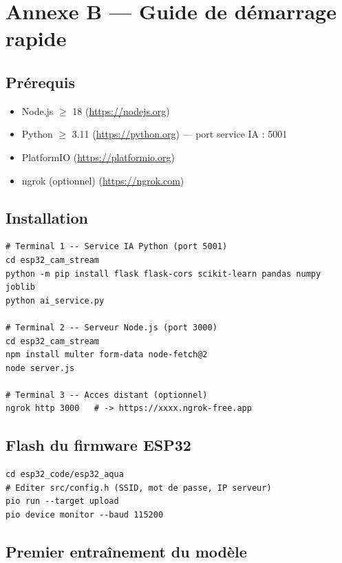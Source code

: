 \documentclass[12pt,a4paper]{report}
\begin{document}
\chapter{Annexe B --- Guide de démarrage rapide}

\section{Prérequis}
\begin{itemize}
  \item Node.js $\geq$ 18 (\url{https://nodejs.org})
  \item Python $\geq$ 3.11 (\url{https://python.org}) --- port service IA : 5001
  \item PlatformIO (\url{https://platformio.org})
  \item ngrok (optionnel) (\url{https://ngrok.com})
\end{itemize}

\section{Installation}

\begin{lstlisting}[caption={Installation et démarrage}]
# Terminal 1 -- Service IA Python (port 5001)
cd esp32_cam_stream
python -m pip install flask flask-cors scikit-learn pandas numpy joblib
python ai_service.py

# Terminal 2 -- Serveur Node.js (port 3000)
cd esp32_cam_stream
npm install multer form-data node-fetch@2
node server.js

# Terminal 3 -- Acces distant (optionnel)
ngrok http 3000   # -> https://xxxx.ngrok-free.app
\end{lstlisting}

\section{Flash du firmware ESP32}

\begin{lstlisting}[caption={Flash via PlatformIO CLI}]
cd esp32_code/esp32_aqua
# Editer src/config.h (SSID, mot de passe, IP serveur)
pio run --target upload
pio device monitor --baud 115200
\end{lstlisting}

\section{Premier entraînement du modèle}
\end{document}
